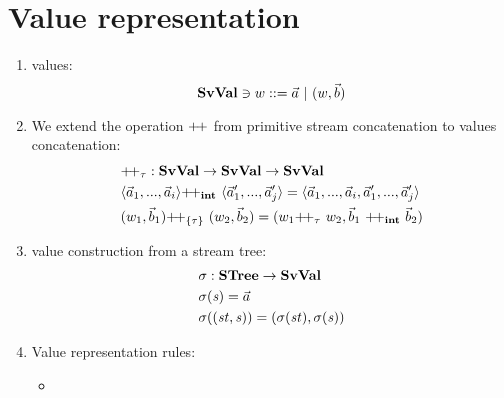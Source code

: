 \begin{itemize}
	\\ [8ex]

	\\[4ex]
	
\end{itemize}


\section{Value representation}
\begin{enumerate}[(1)]
	\item \fmsvcode values: $$\mathbf{SvVal} \ni w ::= \vec a \ | \ (w,\vec b) $$
	
	\item We extend the operation ${\++}$ from primitive stream concatenation to \fmsvcode values concatenation: 
	\begin{align*}
	&{\++}_{\tau}: \SvVal \->  \SvVal \-> \SvVal \\
	&{\<\a_1,...,\a_i\'>} {\++}_{\int} \  {\<\a_1',...,\a_j'\'>} = \<\a_1,...,\a_i,\a_1',...,\a_j'\'> \\
	&{(\v_1,\b_1)} {\++}_{\{\tau\}} \  {(\v_2,\b_2)} = ({\v_1} {\++}_{\tau} \ {\v_2}, {\b_1} \ {\++}_{\int} \ {\b_2})
	\end{align*}
	
	\item \fmsvcode value construction from a stream tree:
	\begin{align*}
	&\sgm : \STree \-> \SvVal \\
	&\sgm(\s) = \a \\
	&\sgm((\st,\s)) = (\sgm(\st), \sgm(\s)) 
	\end{align*}

\item Value representation rules:
	
	\begin{itemize}		
		\item {}
		
	\end{itemize}
\end{enumerate}




